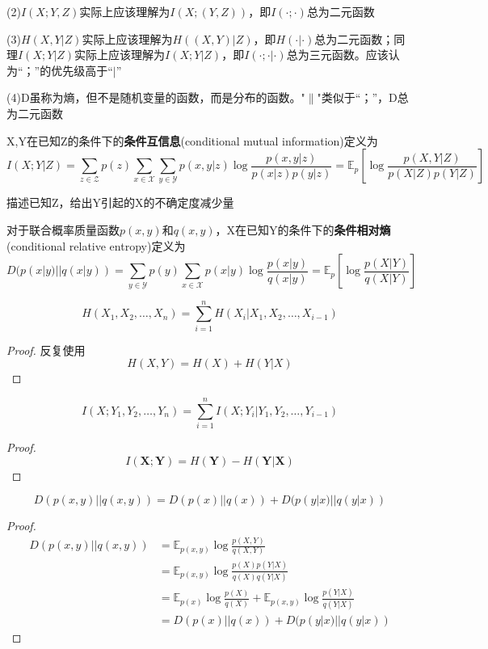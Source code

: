 \documentclass{ctexbook}
\begin{document}
(2)$I(X;Y,Z)$实际上应该理解为$I(X;(Y,Z))$，即$I(\cdot;\cdot)$总为二元函数

(3)$H(X,Y|Z)$实际上应该理解为$H((X,Y)|Z)$，即$H(\cdot|\cdot)$总为二元函数；同理$I(X;Y|Z)$实际上应该理解为$I(X;Y|Z)$，即$I(\cdot;\cdot|\cdot)$总为三元函数。应该认为“；”的优先级高于“$|$”

(4)D虽称为熵，但不是随机变量的函数，而是分布的函数。"$\|$"类似于“；”，D总为二元函数

\begin{definition}[条件互信息]
    X,Y在已知Z的条件下的\textbf{条件互信息}(conditional mutual information)定义为
    \[I(X;Y|Z) = \sum_{z \in \mathcal{Z}} p(z) \sum_{x \in \mathcal{X}} \sum_{y \in \mathcal{Y}} p(x,y|z) \log \frac{p(x,y|z)}{p(x|z)p(y|z)} = \mathbb{E} _p\left[\log \frac{p(X,Y|Z)}{p(X|Z)p(Y|Z)}\right]\]
\end{definition}
\begin{remark}
    描述已知Z，给出Y引起的X的不确定度减少量
\end{remark}

\begin{definition}[条件相对熵]
    对于联合概率质量函数$p(x,y)$和$q(x,y)$，X在已知Y的条件下的\textbf{条件相对熵}(conditional relative entropy)定义为
    \[D(p(x|y)||q(x|y)) = \sum_{y \in \mathcal{Y}} p(y) \sum_{x \in \mathcal{X}} p(x|y) \log \frac{p(x|y)}{q(x|y)} = \mathbb{E} _p\left[\log \frac{p(X|Y)}{q(X|Y)}\right]\]
\end{definition}

\begin{theorem}[熵的链式法则]
    \[H(X_1,X_2,\ldots,X_n) = \sum_{i=1}^n H(X_i|X_{1},X_{2},\ldots,X_{i-1})\]
\end{theorem}
\begin{proof}
    反复使用
    \[H(X,Y) = H(X) + H(Y|X)\]
\end{proof}

\begin{theorem}[互信息的链式法则]
    \[I(X;Y_1,Y_2,\ldots,Y_n) = \sum_{i=1}^n I(X;Y_i|Y_{1},Y_{2},\ldots,Y_{i-1})\]
\end{theorem}
\begin{proof}
    \[I(\mathbf{X};\mathbf{Y}) = H(\mathbf{Y}) - H(\mathbf{Y}|\mathbf{X})\]
\end{proof}

\begin{theorem}[相对熵的链式法则]
    \[D(p(x,y)||q(x,y)) = D(p(x)||q(x)) + D(p(y|x)||q(y|x))\]
\end{theorem}
\begin{proof}
    \begin{align*}
        D(p(x,y)||q(x,y)) &= \mathbb{E} _{p(x,y)}\log \frac{p(X,Y)}{q(X,Y)} \\
        &= \mathbb{E} _{p(x,y)}\log \frac{p(X)p(Y|X)}{q(X)q(Y|X)} \\
        &= \mathbb{E} _{p(x)}\log \frac{p(X)}{q(X)} + \mathbb{E} _{p(x,y)}\log \frac{p(Y|X)}{q(Y|X)} \\
        &= D(p(x)||q(x)) + D(p(y|x)||q(y|x))
    \end{align*}
\end{proof}
\end{document}
